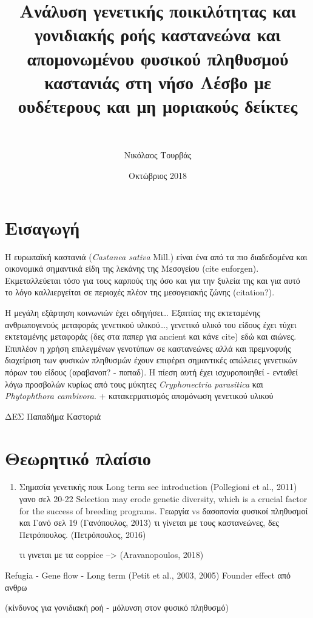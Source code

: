 \documentclass[12pt,a4paper,]{report}
\title{Ανάλυση γενετικής ποικιλότητας και γονιδιακής ροής καστανεώνα και
απομονωμένου φυσικού πληθυσμού καστανιάς στη νήσο Λέσβο με ουδέτερους
και μη μοριακούς δείκτες}
\subtitle{~}
\author{Νικόλαος Τουρβάς}
\date{Οκτώβριος 2018}
\begin{document}
\maketitle

\section{Εισαγωγή}

Η ευρωπαϊκή καστανιά (\emph{Castanea sativa} Mill.) είναι ένα από τα πιο
διαδεδομένα και οικονομικά σημαντικά είδη της λεκάνης της Μεσογείου
(cite euforgen). Εκμεταλλεύεται τόσο για τους καρπούς της όσο και για
την ξυλεία της και για αυτό το λόγο καλλιεργείται σε περιοχές πλέον της
μεσογειακής ζώνης (citation?).

Η μεγάλη εξάρτηση κοινωνιών έχει οδηγήσει\ldots{} Εξαιτίας της
εκτεταμένης ανθρωπογενούς μεταφοράς γενετικού υλικού\ldots{}, γενετικό
υλικό του είδους έχει τύχει εκτεταμένης μεταφοράς (δες στα παπερ για
ancient και κάνε cite) εδώ και αιώνες. Επιπλέον η χρήση επιλεγμένων
γενοτύπων σε καστανεώνες αλλά και πρεμνοφυής διαχείριση των φυσικών
πληθυσμών έχουν επιφέρει σημαντικές απώλειες γενετικών πόρων του είδους
(αραβανοπ? - παπαδ). Η πίεση αυτή έχει ισχυροποιηθεί - ενταθεί λόγω
προσβολών κυρίως από τους μύκητες \emph{Cryphonectria parasitica} και
\emph{Phytophthora cambivora}. + κατακερματισμός απομόνωση γενετικού
υλικού

ΔΕΣ Παπαδήμα Καστοριά

\hypertarget{-}{%
\section{Θεωρητικό πλαίσιο}\label{-}}

\begin{enumerate}
\def\labelenumi{\arabic{enumi}.}
\item
  Σημασία γενετικής ποικ Long term see introduction (Pollegioni et al.,
  2011) γανο σελ 20-22 Selection may erode genetic diversity, which is a
  crucial factor for the success of breeding programs. Γεωργία vs
  δασοπονία φυσικοί πληθυσμοί και Γανό σελ 19 (Γανόπουλος, 2013) τι
  γίνεται με τους καστανεώνες, δες Πετρόπουλος. (Πετρόπουλος, 2016)

  τι γινεται με τα coppice --\textgreater{} (Aravanopoulos, 2018)
\end{enumerate}

Refugia - Gene flow - Long term (Petit et al., 2003, 2005) Founder
effect από ανθρω

(κίνδυνος για γονιδιακή ροή - μόλυνση στον φυσικό πληθυσμό)
\end{document}
